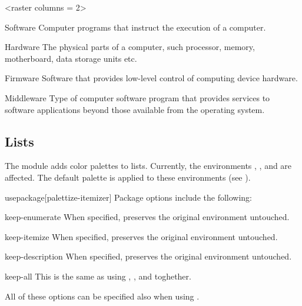 \documentclass[a4paper, 11pt]{article}
\begin{document}
\begin{example}{}
    \begin{tcolorbox}[colback = black]
        \begin{PLTBoxRaster}[enumerate]
            <raster columns = 2>
            \item[Software] Computer programs that instruct the execution of a computer.
            \item[Hardware]The physical parts of a computer, such processor, memory, motherboard, data storage units etc.
            \item[Firmware] Software that provides low-level control of computing device hardware.
            \item[Middleware] Type of computer software program that provides services to software applications beyond those available from the operating system.
        \end{PLTBoxRaster}
    \end{tcolorbox}
\end{example}

\subsection{Lists}\label{sec:itemizer}

The module  adds color palettes to lists. Currently, the environments , , and  are affected. The default palette is applied to these environments (see ).

\begin{macro*}{usepackage}{}[palettize-itemizer]
    Package options include the following:

    \begin{option}{keep-enumerate}{}
        When specified,  preserves the original  environment untouched.
    \end{option}

    \begin{option}{keep-itemize}{}
        When specified,  preserves the original  environment untouched.
    \end{option}

    \begin{option}{keep-description}{}
        When specified,  preserves the original  environment untouched.
    \end{option}

    \begin{option}{keep-all}{}
        This is the same as using , , and  toghether.
    \end{option}

    All of these options can be specified also when using \latexinline{\usepackage{palettize}}.
\end{macro*}
\end{document}
